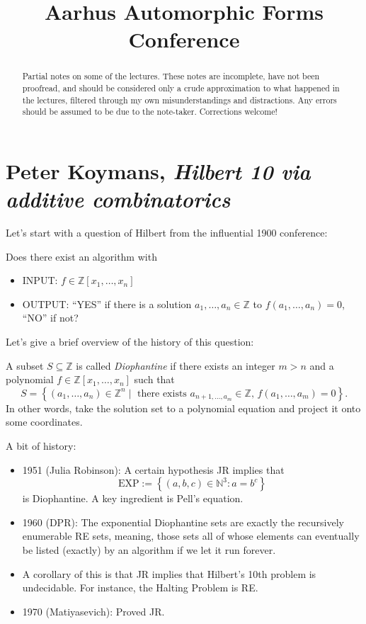 \documentclass[reqno]{amsart} 
\begin{document}
\title{Aarhus Automorphic Forms Conference}

\begin{abstract}
  Partial notes on some of the lectures.  These notes are incomplete, have not been proofread, and should be considered only a crude approximation to what happened in the lectures, filtered through my own misunderstandings and distractions.  Any errors should be assumed to be due to the note-taker.  Corrections welcome!
\end{abstract}


\section{Peter Koymans, \emph{Hilbert 10 via additive combinatorics}}


Let's start with a question of Hilbert from the influential 1900 conference:
\begin{question}
  Does there exist an algorithm with
  \begin{itemize}
  \item INPUT: $f \in \mathbb{Z}[x_1, \dotsc, x_n]$
  \item OUTPUT: ``YES'' if there is a solution $a_1, \dotsc, a_n \in \mathbb{Z}$ to $f(a_1, \dotsc, a_n) = 0$, ``NO'' if not?
  \end{itemize}  
\end{question}
Let's give a brief overview of the history of this question:
\begin{definition}
  A subset $S \subseteq \mathbb{Z}$ is called \emph{Diophantine} if there exists an integer $m > n$ and a polynomial $f \in \mathbb{Z}[x_1, \dotsc, x_n]$ such that
  \begin{equation*}
    S = \left\{(a_1, \dotsc, a_n) \in \mathbb{Z}^n \mid \text{ there exists } a_{n + 1, \dotsc, a_m} \in \mathbb{Z}, \, f(a_1, \dotsc, a_m) = 0 \right\}.
  \end{equation*}
  In other words, take the solution set to a polynomial equation and project it onto some coordinates.
\end{definition}
A bit of history:
\begin{itemize}
\item 1951 (Julia Robinson): A certain hypothesis \textrm{JR} implies that
  \begin{equation*}
    \mathrm{EXP} := \left\{(a, b, c) \in \mathbb{N}^3 : a = b^{c} \right\}
  \end{equation*}
  is Diophantine.  A key ingredient is Pell's equation.
\item 1960 (DPR): The exponential Diophantine sets are exactly the recursively enumerable \textrm{RE} sets, meaning, those sets all of whose elements can eventually be listed (exactly) by an algorithm if we let it run forever.  
\item A corollary of this is that \textrm{JR} implies that Hilbert's 10th problem is undecidable.  For instance, the Halting Problem is \textrm{RE}.
\item 1970 (Matiyasevich): Proved \textrm{JR}.
\end{itemize}
\end{document}
